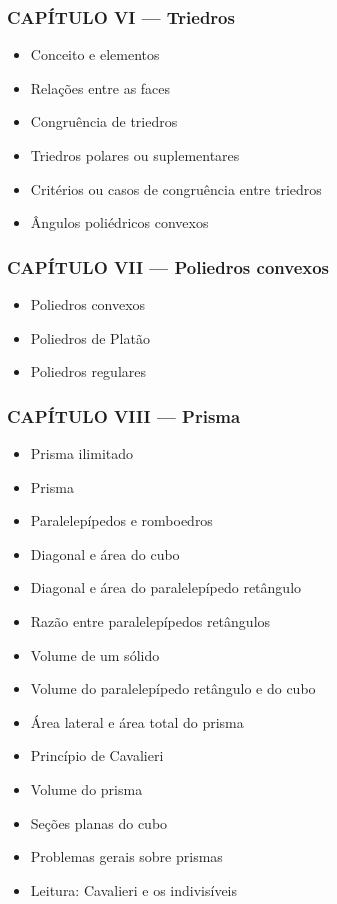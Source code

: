 \documentclass[a4paper,12pt]{article}[abntex2]
\begin{document}
\subsubsection*{CAPÍTULO VI — Triedros}

\begin{itemize}
\item Conceito e elementos
\item Relações entre as faces
\item Congruência de triedros
\item Triedros polares ou suplementares
\item Critérios ou casos de congruência entre triedros
\item Ângulos poliédricos convexos
\end{itemize}
\subsubsection*{CAPÍTULO VII — Poliedros convexos}

\begin{itemize}
\item Poliedros convexos
\item Poliedros de Platão
\item Poliedros regulares
\end{itemize}
\subsubsection*{CAPÍTULO VIII — Prisma}

\begin{itemize}
\item Prisma ilimitado
\item Prisma
\item Paralelepípedos e romboedros
\item Diagonal e área do cubo
\item Diagonal e área do paralelepípedo retângulo
\item Razão entre paralelepípedos retângulos
\item Volume de um sólido
\item Volume do paralelepípedo retângulo e do cubo
\item Área lateral e área total do prisma
\item Princípio de Cavalieri
\item Volume do prisma
\item Seções planas do cubo
\item Problemas gerais sobre prismas
\item Leitura: Cavalieri e os indivisíveis
\end{itemize}
\end{document}
